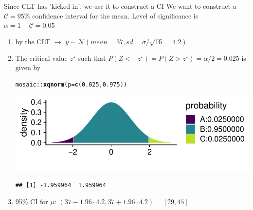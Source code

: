 \documentclass[10pt,handout]{beamer}\usepackage[]{graphicx}\usepackage[]{color}
\makeatletter
\def\maxwidth{ %
  \ifdim\Gin@nat@width>\linewidth
    \linewidth
  \else
    \Gin@nat@width
  \fi
}
\newcommand{\hlnum}[1]{\textcolor[rgb]{0.686,0.059,0.569}{#1}}%
\newcommand{\hlopt}[1]{\textcolor[rgb]{0,0,0}{#1}}%
\newcommand{\hlstd}[1]{\textcolor[rgb]{0.345,0.345,0.345}{#1}}%
\newcommand{\hlkwc}[1]{\textcolor[rgb]{0.333,0.667,0.333}{#1}}%
\newcommand{\hlkwd}[1]{\textcolor[rgb]{0.737,0.353,0.396}{\textbf{#1}}}%
\newenvironment{kframe}{%
 \def\at@end@of@kframe{}%
 \ifinner\ifhmode%
  \def\at@end@of@kframe{\end{minipage}}%
  \begin{minipage}{\columnwidth}%
 \fi\fi%
 \def\FrameCommand##1{\hskip\@totalleftmargin \hskip-\fboxsep
 \colorbox{shadecolor}{##1}\hskip-\fboxsep
     \hskip-\linewidth \hskip-\@totalleftmargin \hskip\columnwidth}%
 \MakeFramed {\advance\hsize-\width
   \@totalleftmargin\z@ \linewidth\hsize
   \@setminipage}}%
 {\par\unskip\endMakeFramed%
 \at@end@of@kframe}
\newenvironment{knitrout}{}{} %
\makeatother
\begin{document}
\begin{frame}[fragile]{Since CLT has 'kicked in', we use it to construct a CI}
	\small
	We want to construct a $\mathcal{C} = 95\%$ confidence interval for the mean. Level of significance is $\alpha = 1-\mathcal{C} = 0.05$ \pause
	
	\begin{enumerate}
		\setlength\itemsep{1em}
		\item by the CLT $\to$ $\bar{y} \sim \mathcal{N}(mean = 37, sd = \sigma/\sqrt{16} = 4.2)$ \pause
		\item The critical value $z^\star$ such that $P(Z < -z^\star) = P(Z > z^\star) = \alpha/2 = 0.025$ is given by 
\begin{knitrout}\tiny
{}\color{fgcolor}\begin{kframe}
\begin{alltt}
\hlstd{mosaic}\hlopt{::}\hlkwd{xqnorm}\hlstd{(}\hlkwc{p} \hlstd{=} \hlkwd{c}\hlstd{(}\hlnum{0.025}\hlstd{,} \hlnum{0.975}\hlstd{))}
\end{alltt}
\end{kframe}

{\centering \includegraphics[width=\maxwidth]{figure/unnamed-chunk-4-1} 

}


\begin{kframe}\begin{verbatim}
## [1] -1.959964  1.959964
\end{verbatim}
\end{kframe}
\end{knitrout}
		\pause
		\item 95\% CI for $\mu$: $(37 - 1.96 \cdot 4.2, 37 + 1.96 \cdot 4.2) = [29, 45]$
	\end{enumerate}
\end{frame}
\end{document}

